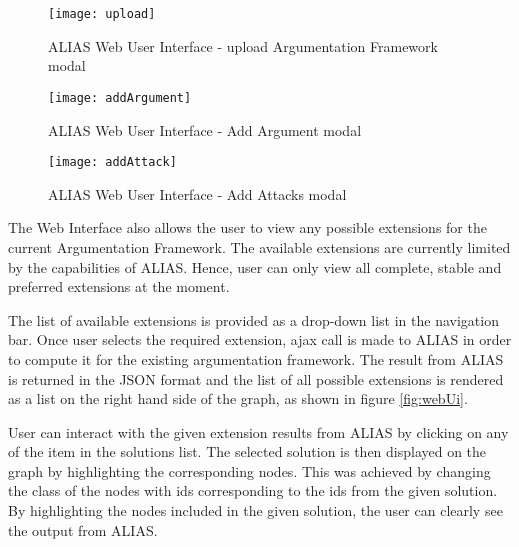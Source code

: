 \begin{figure}[!ht]
	\centering
	\texttt{[image: upload]}
	\caption{ALIAS Web User Interface - upload Argumentation Framework modal}
	\label{fig:upload}
\end{figure}

\begin{figure}[h]
	\centering
	\texttt{[image: addArgument]}
	\caption{ALIAS Web User Interface - Add Argument modal}
	\label{fig:addArgument}
\end{figure}

\begin{figure}[h]
	\centering
	\texttt{[image: addAttack]}
	\caption{ALIAS Web User Interface - Add Attacks modal}
	\label{fig:addAttacks}
\end{figure}

The Web Interface also allows the user to view any possible extensions for the current Argumentation Framework. The available extensions are currently limited by the capabilities of ALIAS. Hence, user can only view all complete, stable and preferred extensions at the moment. 

The list of available extensions is provided as a drop-down list in the navigation bar. Once user selects the required extension, ajax call is made to ALIAS in order to compute it for the existing argumentation framework. The result from ALIAS is returned in the JSON format and the list of all possible extensions is rendered as a list on the right hand side of the graph, as shown in figure \ref{fig:webUi}.

User can interact with the given extension results from ALIAS by clicking on any of the item in the solutions list. The selected solution is then displayed on the graph by highlighting the corresponding nodes. This was achieved by changing the class of the nodes with ids corresponding to the ids from the given solution. By highlighting the nodes included in the given solution, the user can clearly see the output from ALIAS.